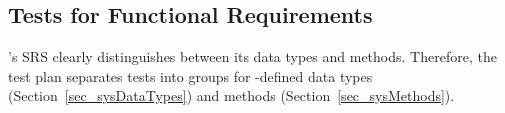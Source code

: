 \subsection{Tests for Functional Requirements}
\progname{}'s SRS clearly distinguishes between its data types and methods.
Therefore, the test plan separates tests into groups for \progname{}-defined
data types (Section~\ref{sec_sysDataTypes}) and methods
(Section~\ref{sec_sysMethods}).



\clearpage

